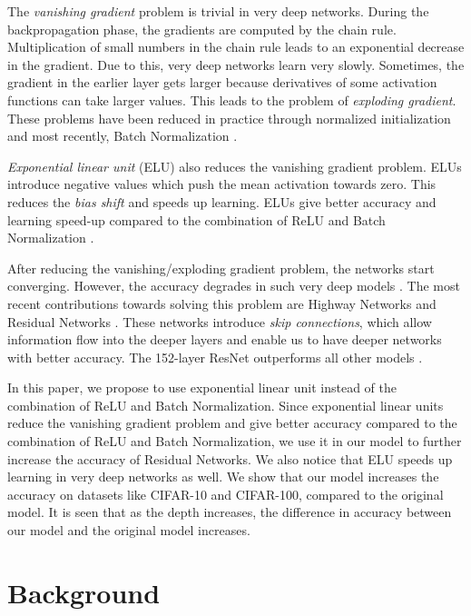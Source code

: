 \documentclass[10pt,twocolumn,letterpaper]{article}
\begin{document}
The \emph{vanishing gradient} problem is trivial in very deep networks. During the backpropagation phase, the gradients are computed by the chain rule. Multiplication of small numbers in the chain rule leads to an exponential decrease in the gradient. Due to this, very deep networks learn very slowly. Sometimes, the gradient in the earlier layer gets larger because derivatives of some activation functions can take larger values. This leads to the problem of \emph{exploding gradient}. These problems have been reduced in practice through normalized initialization \cite{[3]} and most recently, Batch Normalization \cite{[4]}.

\emph{Exponential linear unit} (ELU) \cite{[9]} also reduces the vanishing gradient problem. ELUs introduce negative values which push the mean activation towards zero. This reduces the \emph{bias shift} and speeds up learning. ELUs give better accuracy and learning speed-up compared to the combination of ReLU \cite{[8]} and Batch Normalization \cite{[4]}.

After reducing the vanishing/exploding gradient problem, the networks start converging. However, the accuracy degrades in such very deep models \cite{[1]}. The most recent contributions towards solving this problem are Highway Networks \cite{[7]} and Residual Networks \cite{[1]}. These networks introduce \emph{skip connections}, which allow information flow into the deeper layers and enable us to have deeper networks with better accuracy. The 152-layer ResNet outperforms all other models \cite{[1]}. 

In this paper, we propose to use exponential linear unit instead of the combination of ReLU and Batch Normalization. Since exponential linear units reduce the vanishing gradient problem and give better accuracy compared to the combination of ReLU and Batch Normalization, we use it in our model to further increase the accuracy of Residual Networks. We also notice that ELU speeds up learning in very deep networks as well. We show that our model increases the accuracy on datasets like CIFAR-10 and CIFAR-100, compared to the original model. It is seen that as the depth increases, the difference in accuracy between our model and the original model increases.


\section{Background}
\end{document}
